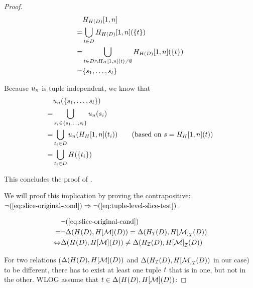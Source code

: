 \begin{proof}
  \begin{align*}
    &H_{H(D)}{[1,n]}\\
    = &\bigcup_{t \in D} H_{H(D)}{[1,n]}(\{t\})\\
    = &\bigcup_{t \in D \land H_{H}{[1,n]}(t) \neq \emptyset} H_{H(D)}{[1,n]}(\{t\})\\
    = &\{s_1, \ldots, s_l\}
  \end{align*}

  Because $u_n$ is tuple independent, we know that
  \begin{align*}
    &\up_n(\{s_1, \ldots, s_l\})\\
    = &\bigcup_{s_i \in \{s_1, \ldots, s_l\}} \up_n(s_i)\\
    = & \bigcup_{\tup_i \in \db} \up_n(\hislice{\history}{[1,n]}(\tup_i)) \tag{based on $s = \hislice{\history}{[1,n]}(\tup)$}\\
    = &\bigcup_{\tup_i \in \db} \history(\{\tup_i\})
  \end{align*}

  This concludes the proof of .

  We will proof this implication by proving the contrapositive:  $\neg (\ref{eq:slice-original-cond}) \Rightarrow \neg (\ref{eq:tuple-level-slice-test})$.

  \begin{align*}
    &\neg (\ref{eq:slice-original-cond}) \\
    = &\neg \Delta(H(D),H[\mathcal{M}](D)) = \Delta({H}_{\mathcal{I}}(D),{H[\mathcal{M}]}_{\mathcal{I}}(D))\\
    \Leftrightarrow &\Delta(H(D),H[\mathcal{M}](D)) \neq \Delta({H}_{\mathcal{I}}(D),{H[\mathcal{M}]}_{\mathcal{I}}(D))
  \end{align*}

  For two relations ($\Delta(H(D),H[\mathcal{M}](D))$ and $\Delta({H}_{\mathcal{I}}(D),{H[\mathcal{M}]}_{\mathcal{I}}(D))$ in our case) to be different, there has to exist at least one tuple $t$ that is in one, but not in the other. WLOG assume that $t \in \Delta(H(D),H[\mathcal{M}](D))$:


\end{proof}
